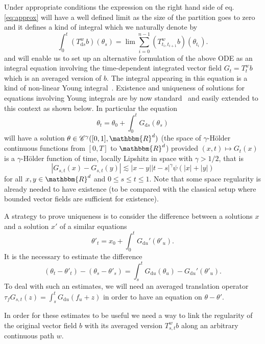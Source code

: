 \documentclass[a4paper,11pt]{article}
\newcommand{\mathd}{\mathrm{d}}
\newcommand{\CC}{\mathscr C}
\begin{document}
Under appropriate conditions the expression on the right hand side of
eq.{\eqref{eq:approx}} will have a well defined limit as the size of the
partition goes to zero and it defines a kind of integral which we naturally
denote by
\[ \int_{0}^{t} (T^{w}_{\mathd s} b) ( \theta_{s} ) = \lim   \sum_{i=0}^{n-1}
   (T^{w}_{t_{i} ,t_{i+1}} b) ( \theta_{t_{i}} ) . \]
and will enable us to set up an alternative formulation of the above ODE as an
integral equation involving the time-dependent integrated vector field $G_{t}
=T^{w}_{t} b$ which is an averaged version of $b$. The integral appearing in
this equation is a kind of non-linear Young integral~{\cite{Young}}. Existence
and uniqueness of solutions for equations involving Young integrals are by now
standard~{\cite{Lyons,controlling,FV}} and easily extended to this context as
shown below. In particular the equation
\[ \theta_{t} = \theta_{0} + \int_{0}^{t} G_{\mathd s} ( \theta_{s} ) \]
will have a solution $\theta \in \CC^{\gamma} ([0,1],\mathbbm{R}^{d} )$ (the
space of $\gamma$-Hölder continuous functions from $[0,T]$ to $\mathbbm{R}^{d}$) provided
$(x,t) \mapsto G_{t} (x)$ is a $\gamma$-Hölder function of time, locally
Lipshitz in space with $\gamma >1/2$, that is
\[ |G_{s,t} (x)-G_{s,t} (y)| \lesssim |x-y|  |t-s|^{\gamma} \psi ( | x | + | y
   | ) \]
for all $x,y \in \mathbbm{R}^{d}$ and $0 \leqslant s \leqslant t \leqslant 1$.
Note that some space regularity is already needed to have existence (to be
compared with the classical setup where bounded vector fields are sufficient for existence).

A strategy to prove uniqueness is to consider the difference between a
solutions $x$ and a solution $x'$ of a similar equations
\[ \theta'_{t} =x_{0} + \int_{0}^{t} G_{\mathd u}' (\theta'_{u} ) . \]
It is the necessary to estimate the difference
\[ (\theta_{t} -\theta'_{t} ) - (\theta_{s} -\theta'_{s} ) = \int_{s}^{t} G_{\mathd u} (\theta_{u} )
   -G_{\mathd u}' (\theta'_{u} ). \]
To deal with such an estimates, we will need an averaged translation operator
$\tau_{f}  G_{s,t} ( z ) = \int_{s}^{t} G_{\mathd u} ( f_{u} +z )$ in order to
have an equation on $\theta-\theta'$.

In order for these estimates to be useful we need a way to link the
regularity of the original vector field $b$ with its averaged version
$T^{w}_{s,t} b$ along an arbitrary continuous path $w$.
\end{document}
